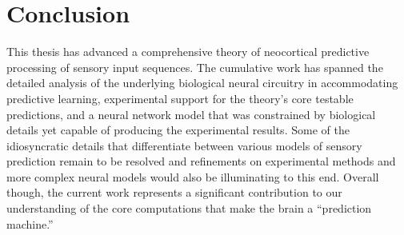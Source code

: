 \documentclass[dwyatte_dissertation.tex]{subfiles}
\begin{document}

\section{Conclusion}
This thesis has advanced a comprehensive theory of neocortical predictive processing of sensory input sequences. The cumulative work has spanned the detailed analysis of the underlying biological neural circuitry in accommodating predictive learning, experimental support for the theory's core testable predictions, and a neural network model that was constrained by biological details yet capable of producing the experimental results. Some of the idiosyncratic details that differentiate between various models of sensory prediction remain to be resolved and refinements on experimental methods and more complex neural models would also be illuminating to this end. Overall though, the current work represents a significant contribution to our understanding of the core computations that make the brain a ``prediction machine.''

%
%
\end{document}
